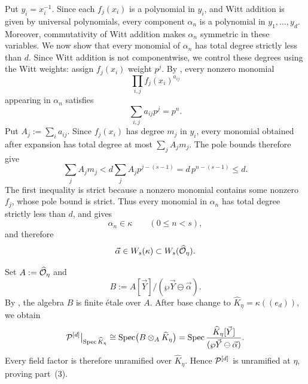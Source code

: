Put $y_i=x_i^{-1}$. Since each $f_j(x_i)$ is a polynomial in $y_i$, and
Witt addition is given by universal polynomials, every component $\alpha_n$
is a polynomial in $y_1,\dots,y_d$. Moreover, commutativity of Witt addition
makes $\alpha_n$ symmetric in these variables. We now show that every monomial
of $\alpha_n$ has total degree strictly less than $d$. Since Witt addition is
not componentwise, we control these degrees using the Witt weights: assign
$f_j(x_i)$ weight $p^j$. By
, every nonzero monomial
\[
    \prod_{i,j}f_j(x_i)^{a_{ij}}
\]
appearing in $\alpha_n$ satisfies
\[
    \sum_{i,j}a_{ij}p^j=p^n.
\]
Put $A_j:=\sum_i a_{ij}$. Since $f_j(x_i)$ has degree $m_j$ in $y_i$,
every monomial obtained after expansion has total degree at most
$\sum_jA_jm_j$. The pole bounds therefore give
\[
    \sum_jA_jm_j
       <d\sum_jA_jp^{j-(s-1)}
       =d\,p^{n-(s-1)}
       \leq d.
\]
The first inequality is strict because a nonzero monomial contains some
nonzero $f_j$, whose pole bound is strict. Thus every monomial in $\alpha_n$
has total degree strictly less than $d$, and
 gives
\[
    \alpha_n\in\kappa\qquad(0\leq n<s),
\]
and therefore
\[
    \vec\alpha\in W_s(\kappa)\subset W_s(\widehat{\mathcal{O}}_\eta).
\]

Set $A:=\widehat{\mathcal{O}}_\eta$ and
\[
    B:=A[\vec Y]/(\wp\vec Y\ominus\vec\alpha).
\]
By , the algebra $B$ is finite \'etale over
$A$. After base change to $\widehat K_\eta=\kappa((e_d))$, we obtain
\[
    \mathcal{P}^{[d]}\big|_{\operatorname{Spec}\widehat K_\eta}
       \cong
    \operatorname{Spec}\bigl(B\otimes_A\widehat K_\eta\bigr)
       =
    \operatorname{Spec}\frac{\widehat K_\eta[\vec Y]}
                   {(\wp\vec Y\ominus\vec\alpha)}.
\]
Every field factor is therefore unramified over $\widehat K_\eta$. Hence
$\mathcal{P}^{[d]}$ is unramified at $\eta$, proving part~(3).
